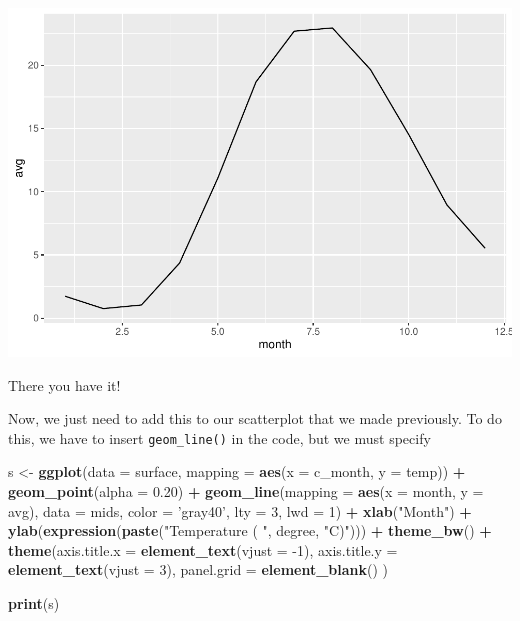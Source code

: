 \documentclass[
]{book}
\newenvironment{Shaded}{\begin{snugshade}}{\end{snugshade}}
\newcommand{\DataTypeTok}[1]{\textcolor[rgb]{0.13,0.29,0.53}{#1}}
\newcommand{\DecValTok}[1]{\textcolor[rgb]{0.00,0.00,0.81}{#1}}
\newcommand{\FloatTok}[1]{\textcolor[rgb]{0.00,0.00,0.81}{#1}}
\newcommand{\KeywordTok}[1]{\textcolor[rgb]{0.13,0.29,0.53}{\textbf{#1}}}
\newcommand{\NormalTok}[1]{#1}
\newcommand{\OperatorTok}[1]{\textcolor[rgb]{0.81,0.36,0.00}{\textbf{#1}}}
\newcommand{\StringTok}[1]{\textcolor[rgb]{0.31,0.60,0.02}{#1}}
\begin{document}
\includegraphics{worstr_files/figure-latex/unnamed-chunk-109-1.pdf}

There you have it!

Now, we just need to add this to our scatterplot that we made previously. To do this, we have to insert \texttt{geom\_line()} in the code, but we must specify

\begin{Shaded}
\begin{Highlighting}[]
\NormalTok{s <-}\StringTok{ }\KeywordTok{ggplot}\NormalTok{(}\DataTypeTok{data =}\NormalTok{ surface, }\DataTypeTok{mapping =} \KeywordTok{aes}\NormalTok{(}\DataTypeTok{x =}\NormalTok{ c_month, }\DataTypeTok{y =}\NormalTok{ temp)) }\OperatorTok{+}
\StringTok{  }\KeywordTok{geom_point}\NormalTok{(}\DataTypeTok{alpha =} \FloatTok{0.20}\NormalTok{) }\OperatorTok{+}\StringTok{ }
\StringTok{  }\KeywordTok{geom_line}\NormalTok{(}\DataTypeTok{mapping =} \KeywordTok{aes}\NormalTok{(}\DataTypeTok{x =}\NormalTok{ month, }\DataTypeTok{y =}\NormalTok{ avg),}
            \DataTypeTok{data =}\NormalTok{ mids,}
            \DataTypeTok{color =} \StringTok{'gray40'}\NormalTok{,}
            \DataTypeTok{lty =} \DecValTok{3}\NormalTok{,}
            \DataTypeTok{lwd =} \DecValTok{1}\NormalTok{) }\OperatorTok{+}
\StringTok{  }\KeywordTok{xlab}\NormalTok{(}\StringTok{"Month"}\NormalTok{) }\OperatorTok{+}
\StringTok{  }\KeywordTok{ylab}\NormalTok{(}\KeywordTok{expression}\NormalTok{(}\KeywordTok{paste}\NormalTok{(}\StringTok{"Temperature ( "}\NormalTok{, degree, }\StringTok{"C)"}\NormalTok{))) }\OperatorTok{+}
\StringTok{  }\KeywordTok{theme_bw}\NormalTok{() }\OperatorTok{+}
\StringTok{  }\KeywordTok{theme}\NormalTok{(}\DataTypeTok{axis.title.x =} \KeywordTok{element_text}\NormalTok{(}\DataTypeTok{vjust =} \DecValTok{-1}\NormalTok{),}
        \DataTypeTok{axis.title.y =} \KeywordTok{element_text}\NormalTok{(}\DataTypeTok{vjust =} \DecValTok{3}\NormalTok{),}
        \DataTypeTok{panel.grid =} \KeywordTok{element_blank}\NormalTok{()}
\NormalTok{  )}

\KeywordTok{print}\NormalTok{(s)}
\end{Highlighting}
\end{Shaded}
\end{document}
